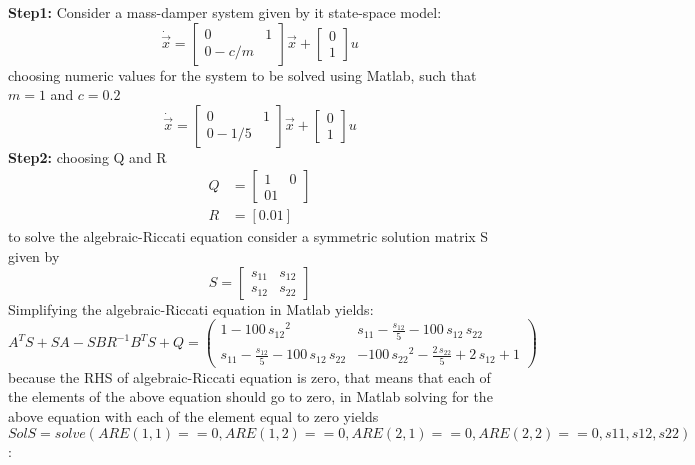 \textbf{Step1: }Consider a mass-damper system given by it state-space model:
\begin{equation*}
	\dot{\vec{x}} = \begin{bmatrix}
		0 & 1 \\ 0 -c/m
	\end{bmatrix} \vec{x} + \begin{bmatrix}
	0 \\ 1
	\end{bmatrix} u
\end{equation*}
choosing numeric values for the system to be solved using Matlab, such that $m = 1$ and $c = 0.2$
\begin{equation*}
\dot{\vec{x}} = \begin{bmatrix}
0 & 1 \\ 0 -1/5
\end{bmatrix} \vec{x} + \begin{bmatrix}
0 \\ 1
\end{bmatrix} u
\end{equation*}
\textbf{Step2: }choosing Q and R
\begin{align*}
	Q &= \begin{bmatrix}
	1 & 0 \\ 0 1
	\end{bmatrix} \\
	R &= [0.01]
\end{align*}
to solve the algebraic-Riccati equation consider a symmetric solution matrix S given by
\begin{equation*}
	S = \begin{bmatrix}
		s_{11} & s_{12} \\ s_{12} & s_{22}
	\end{bmatrix}
\end{equation*}
Simplifying the algebraic-Riccati equation in Matlab yields:
\begin{equation*}
	A^{T}S + SA - SBR^{-1} B^{T} S + Q = \left(\begin{array}{cc} 1-100\,{s_{12}}^2 & s_{11}-\frac{s_{12}}{5}-100\,s_{12}\,s_{22}\\ s_{11}-\frac{s_{12}}{5}-100\,s_{12}\,s_{22} & -100\,{s_{22}}^2-\frac{2\,s_{22}}{5}+2\,s_{12}+1 \end{array}\right)
\end{equation*}
because the RHS of algebraic-Riccati equation is zero, that means that each of the elements of the above equation should go to zero, in Matlab solving for the above equation with each of the element equal to zero yields $SolS = solve(ARE(1,1)==0,ARE(1,2)==0,ARE(2,1)==0,ARE(2,2)==0,s11,s12,s22)$:
